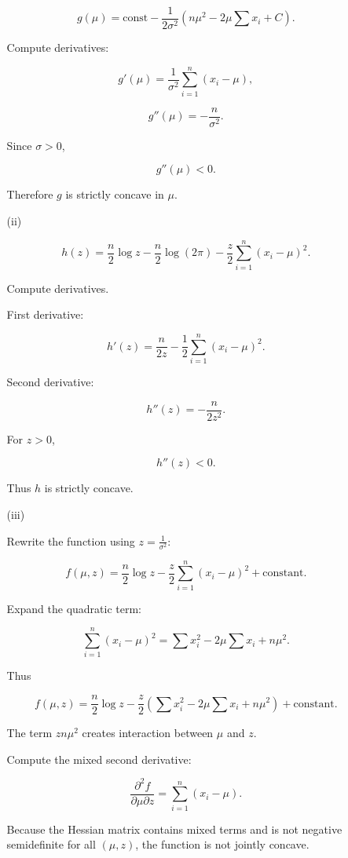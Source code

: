 \documentclass[
  12pt,
]{fphw}
\begin{document}
\begin{enumerate}
\begin{enumerate}
\[
g(\mu)=\text{const} - \frac{1}{2\sigma^2}(n\mu^2 -2\mu\sum x_i + C).
\]

Compute derivatives:

\[
g'(\mu)=\frac{1}{\sigma^2}\sum_{i=1}^n (x_i-\mu),
\]

\[
g''(\mu)= -\frac{n}{\sigma^2}.
\]

Since $\sigma>0$,

\[
g''(\mu)<0.
\]

Therefore $g$ is strictly concave in $\mu$.

\item[(ii)]

\[
h(z)=
\frac{n}{2}\log z - \frac{n}{2}\log(2\pi)
-
\frac{z}{2}\sum_{i=1}^n (x_i-\mu)^2.
\]

Compute derivatives.

First derivative:

\[
h'(z)=\frac{n}{2z}-\frac{1}{2}\sum_{i=1}^n (x_i-\mu)^2.
\]

Second derivative:

\[
h''(z)= -\frac{n}{2z^2}.
\]

For $z>0$,

\[
h''(z)<0.
\]

Thus $h$ is strictly concave.


\item[(iii)]

Rewrite the function using $z=\frac{1}{\sigma^2}$:

\[
f(\mu,z)=
\frac{n}{2}\log z
-
\frac{z}{2}\sum_{i=1}^n (x_i-\mu)^2
+ \text{constant}.
\]

Expand the quadratic term:

\[
\sum_{i=1}^n (x_i-\mu)^2
=
\sum x_i^2 -2\mu\sum x_i + n\mu^2.
\]

Thus

\[
f(\mu,z)=
\frac{n}{2}\log z
-
\frac{z}{2}
(\sum x_i^2 -2\mu\sum x_i + n\mu^2)
+ \text{constant}.
\]

The term $zn\mu^2$ creates interaction between $\mu$ and $z$.

Compute the mixed second derivative:

\[
\frac{\partial^2 f}{\partial \mu \partial z}
=
\sum_{i=1}^n (x_i-\mu).
\]

Because the Hessian matrix contains mixed terms and is not negative semidefinite for all $(\mu,z)$, the function is not jointly concave.

\end{enumerate}

\bigskip


\end{enumerate}
\end{document}
